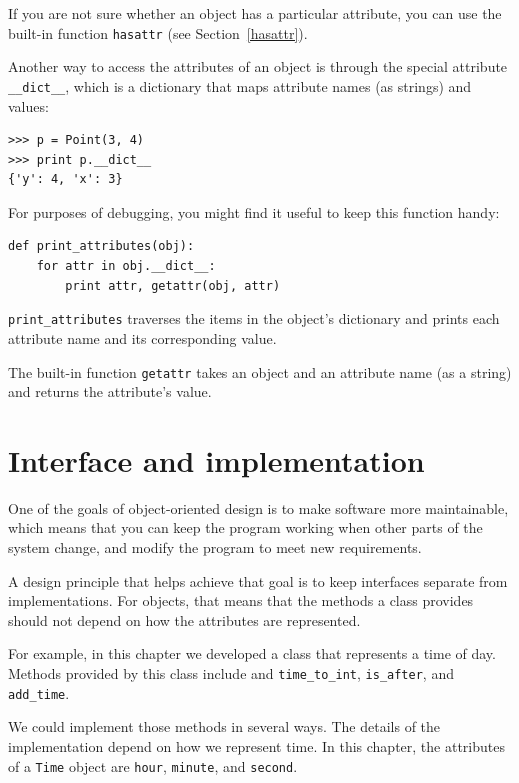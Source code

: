 \documentclass[10pt]{book}
\begin{document}
\begin{CJK}{UTF8}{gbsn}
If you are not sure whether an object has a particular attribute, you
can use the built-in function {\tt hasattr} (see Section~\ref{hasattr}).

Another way to access the attributes of an object is through the
special attribute \verb"__dict__", which is a dictionary that maps
attribute names (as strings) and values:

\begin{verbatim}
>>> p = Point(3, 4)
>>> print p.__dict__
{'y': 4, 'x': 3}
\end{verbatim}
%
For purposes of debugging, you might find it useful to keep this
function handy:

\begin{verbatim}
def print_attributes(obj):
    for attr in obj.__dict__:
        print attr, getattr(obj, attr)
\end{verbatim}
%
\verb"print_attributes" traverses the items in the object's dictionary
and prints each attribute name and its corresponding value.

The built-in function {\tt getattr} takes an object and an attribute
name (as a string) and returns the attribute's value.


\section{Interface and implementation}

One of the goals of object-oriented design is to make software more
maintainable, which means that you can keep the program working when
other parts of the system change, and modify the program to meet new
requirements.

A design principle that helps achieve that goal is to keep
interfaces separate from implementations.  For objects, that means
that the methods a class provides should not depend on how the
attributes are represented.

For example, in this chapter we developed a class that represents
a time of day.  Methods provided by this class include
and \verb"time_to_int", \verb"is_after", and \verb"add_time".

We could implement those methods in several ways.  The details of the
implementation depend on how we represent time.  In this chapter, the
attributes of a {\tt Time} object are {\tt hour}, {\tt minute}, and
{\tt second}.


\end{CJK}
\end{document}
